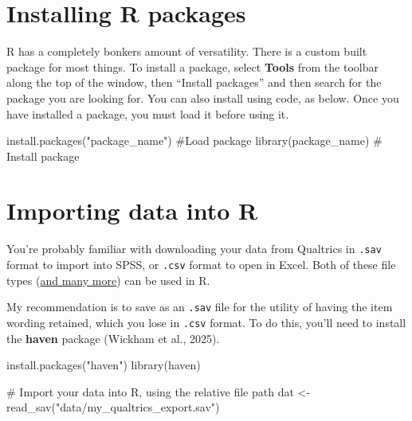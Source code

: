 \documentclass[
  letterpaper,
  DIV=11,
  numbers=noendperiod]{scrreprt}
\newenvironment{Shaded}{\begin{snugshade}}{\end{snugshade}}
\newcommand{\CommentTok}[1]{\textcolor[rgb]{0.37,0.37,0.37}{#1}}
\newcommand{\FunctionTok}[1]{\textcolor[rgb]{0.28,0.35,0.67}{#1}}
\newcommand{\NormalTok}[1]{\textcolor[rgb]{0.00,0.23,0.31}{#1}}
\newcommand{\OtherTok}[1]{\textcolor[rgb]{0.00,0.23,0.31}{#1}}
\newcommand{\StringTok}[1]{\textcolor[rgb]{0.13,0.47,0.30}{#1}}
\begin{document}
\section{Installing R packages}\label{installing-r-packages}

R has a completely bonkers amount of versatility. There is a custom
built package for most things. To install a package, select
\textbf{Tools} from the toolbar along the top of the window, then
``Install packages'' and then search for the package you are looking
for. You can also install using code, as below. Once you have installed
a package, you must load it before using it.

\begin{Shaded}
\begin{Highlighting}[]
\FunctionTok{install.packages}\NormalTok{(}\StringTok{"package\_name"}\NormalTok{) }\CommentTok{\#Load package}
\FunctionTok{library}\NormalTok{(package\_name) }\CommentTok{\# Install package}
\end{Highlighting}
\end{Shaded}

\section{Importing data into R}\label{importing-data-into-r}

You're probably familiar with downloading your data from Qualtrics in
\texttt{.sav} format to import into SPSS, or \texttt{.csv} format to
open in Excel. Both of these file types
(\href{https://rfaqs.com/r-language-basics/files-in-r/}{and many more})
can be used in R.

My recommendation is to save as an \texttt{.sav} file for the utility of
having the item wording retained, which you lose in \texttt{.csv}
format. To do this, you'll need to install the \textbf{haven} package
(Wickham et al., 2025).

\begin{Shaded}
\begin{Highlighting}[]
\FunctionTok{install.packages}\NormalTok{(}\StringTok{"haven"}\NormalTok{)}
\FunctionTok{library}\NormalTok{(haven)}

\CommentTok{\# Import your data into R, using the relative file path}
\NormalTok{dat }\OtherTok{\textless{}{-}} \FunctionTok{read\_sav}\NormalTok{(}\StringTok{"data/my\_qualtrics\_export.sav"}\NormalTok{)}
\end{Highlighting}
\end{Shaded}
\end{document}
